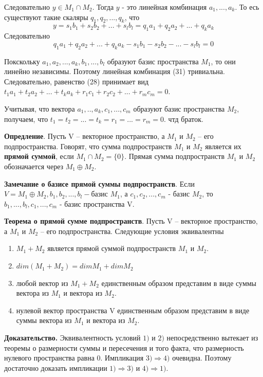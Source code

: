 \documentclass[a4paper]{article}
\begin{document}
Следовательно $y \in M_1 \cap M_2$. Тогда $y$ - это линейная комбинация $a_1, ..., a_k$. То есь существуют такие скаляры $q_1, q_2, ..., q_k$, что 
\begin{equation}
y = s_1b_1+s_2b_2+...+s_lb_l = q_1a_1 + q_2a_2 + ... + q_ka_k
\end{equation}
Следовательно 
\begin{equation}
q_1a_1 + q_2a_2 + ... + q_ka_k - s_1b_1 - s_2b_2-... - s_lb_l = 0
\end{equation}

Покскольку $a_1, a_2, ..., a_k, b_1, ..., b_l$ образуют базис пространства $M_1$, то они линейно независимы. Поэтому линейная комбинация (31) тривиальна. Следовательно, равенство (28) принимает вид $t_1a_1 +t_2a_2 + ... + t_ka_k +r_1c_1 + r_2c_2 + ... + r_mc_m = 0$.

Учитывая, что вектора $a_1, .., a_k, c_1, ..., c_m$ образуют базис пространства $M_2$, получаем, что $t_1 = t_2 = ... = t_k = r_1 = ... = r_m = 0$. чтд браток.

\textbf{Опредление}. Пусть V – векторное пространство, а $M_1$ и $M_2$ – его подпространства.
Говорят, что сумма подпространств $M_1$ и $M_2$ является их \textbf{прямой суммой},
если $M_1 \cap M_2 =\{ 0 \}$. Прямая сумма подпространств $M_1$ и $M_2$
обозначается через $M_1 \oplus M_2$. 

\textbf{Замечание о базисе прямой суммы подпространств}. Если $V = M_1 \oplus M_2, b_1, b_2, ..., b_l - $базис $M_1$, а $c_1, c_2, ..., c_m$ - базис $M_2$, то $b_1, ..., b_l, c_1, ..., c_m$ - базис пространства V.

\textbf{Теорема о прямой сумме подпространств}. Пусть V – векторное пространство, а $M_1$ и $M_2$ – его подпространства. Следующие условия эквивалентны \begin{enumerate}
\item $M_1 + M_2$ является прямой суммой подпространств $M_1$ и $M_2$.
\item $dim(M_1+M_2) = dim M_1 + dim M_2$
\item любой вектор из $M_1+M_2$ единственным образом представим в виде суммы вектора из $M_1$ и вектора из $M_2$.
\item нулевой вектор пространства V единственным образом представим в виде суммы вектора из $M_1$ и вектора из $M_2$.
\end{enumerate}

\textbf{Доказательство.} Эквивалентность условий $1)$ и $2)$ непосредственно
вытекает из теоремы о размерности суммы и пересечения и того факта,
что размерность нулевого пространства равна 0. Импликация $3) \Rightarrow 4)$
очевидна. Поэтому достаточно доказать импликации $1) \Rightarrow 3)$ и $4) \Rightarrow 1)$.
\end{document}

